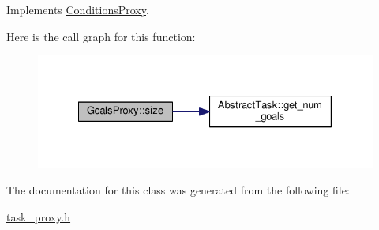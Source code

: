 Implements \hyperlink{classConditionsProxy_af0710776571971659082f0140e4cdba3}{Conditions\-Proxy}.



Here is the call graph for this function\-:
\nopagebreak
\begin{figure}[H]
\begin{center}
\leavevmode
\includegraphics[width=328pt]{classGoalsProxy_abfc758e237e5ef8d56fd1e0c0f3eb6f8_cgraph}
\end{center}
\end{figure}




The documentation for this class was generated from the following file\-:\begin{DoxyCompactItemize}
\item 
\hyperlink{task__proxy_8h}{task\-\_\-proxy.\-h}\end{DoxyCompactItemize}
